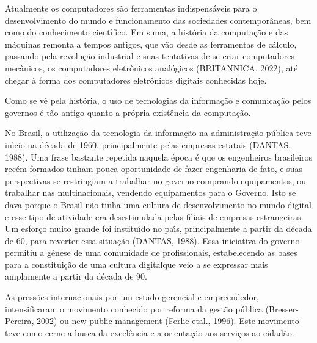\documentclass[
12pt,		%
openright,	%
twoside,  %
a4paper,			%
chapter=TITLE,		%
english,			%
french,				%
spanish,			%
brazil				%
]{USPSC-classe/USPSC}
\begin{document}
Atualmente os computadores s\~ao ferramentas indispens\'aveis para o desenvolvimento do mundo e funcionamento das sociedades contempor\^aneas, bem como do conhecimento cient\'{\i}fico. Em suma, a hist\'oria da computa\c{c}\~ao e das m\'aquinas remonta a tempos antigos, que v\~ao desde as ferramentas de c\'alculo, passando pela revolu\c{c}\~ao industrial e suas tentativas de se criar computadores mec\^anicos, os computadores eletr\^onicos anal\'ogicos  (BRITANNICA, 2022), at\'e chegar \`a forma dos computadores eletr\^onicos digitais conhecidas hoje.









Como se v\^e pela hist\'oria, o uso de tecnologias da informa\c{c}\~ao e comunica\c{c}\~ao pelos governos \'e t\~ao antigo quanto a pr\'opria exist\^encia da computa\c{c}\~ao.









No Brasil, a utiliza\c{c}\~ao da tecnologia da informa\c{c}\~ao na administra\c{c}\~ao p\'ublica teve in\'{\i}cio na d\'ecada de 1960, principalmente pelas empresas estatais  (DANTAS, 1988). Uma frase bastante repetida naquela \'epoca \'e que os engenheiros brasileiros rec\'em formados tinham pouca oportunidade de fazer engenharia de fato, e suas perspectivas se restringiam a trabalhar no governo comprando equipamentos, ou trabalhar nas multinacionais, vendendo equipamentos para o Governo. Isto se dava porque o Brasil n\~ao tinha uma cultura de desenvolvimento no mundo digital e esse tipo de atividade era desestimulada pelas filiais de empresas estrangeiras. Um esfor\c{c}o muito grande foi institu\'{\i}do no pa\'{\i}s, principalmente a partir da d\'ecada de 60, para reverter essa situa\c{c}\~ao  (DANTAS, 1988). Essa iniciativa do governo permitiu a g\^enese de uma comunidade de profissionais, estabelecendo as bases para a constitui\c{c}\~ao de uma \textquotedbl cultura digital\textquotedbl  que veio a se expressar mais amplamente a partir da d\'ecada de 90.









As press\~oes internacionais por um estado \textquotedbl gerencial e empreendedor, intensificaram o movimento conhecido por reforma da gest\~ao p\'ublica (Bresser-Pereira, 2002) ou new public management (Ferlie etal., 1996). Este movimento teve como cerne a \textquotedbl busca da excel\^encia e a orienta\c{c}\~ao aos servi\c{c}os ao cidad\~ao.
\end{document}
